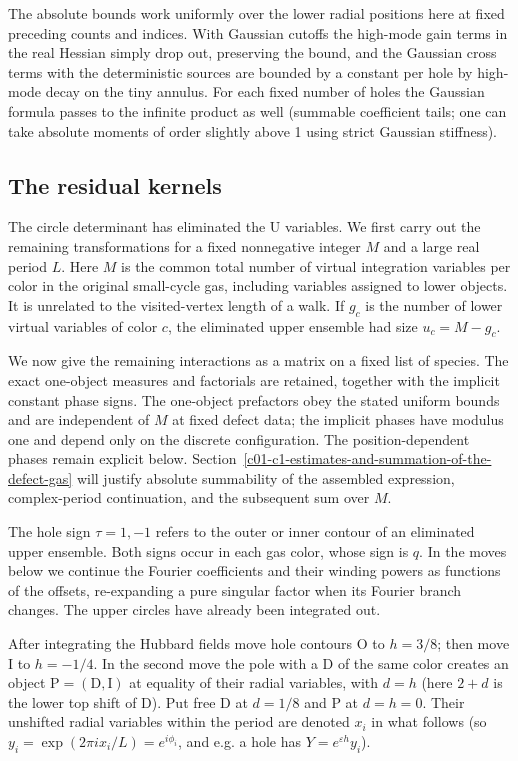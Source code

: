 The absolute bounds work uniformly over the lower radial positions here at fixed preceding counts and indices. With Gaussian cutoffs the high-mode gain terms in the real Hessian simply drop out, preserving the bound, and the Gaussian cross terms with the deterministic sources are bounded by a constant per hole by high-mode decay on the tiny annulus. For each fixed number of holes the Gaussian formula passes to the infinite product as well (summable coefficient tails; one can take absolute moments of order slightly above 1 using strict Gaussian stiffness).

\subsection{The residual kernels}\label{c01-c1-the-residual-kernels}

The circle determinant has eliminated the \(\mathrm U\) variables. We first carry out the remaining transformations for a fixed nonnegative integer \(M\) and a large real period \(L\). Here \(M\) is the common total number of virtual integration variables per color in the original small-cycle gas, including variables assigned to lower objects. It is unrelated to the visited-vertex length of a walk. If \(g_c\) is the number of lower virtual variables of color \(c\), the eliminated upper ensemble had size \(u_c=M-g_c\).

We now give the remaining interactions as a matrix on a fixed list of species. The exact one-object measures and factorials are retained, together with the implicit constant phase signs. The one-object prefactors obey the stated uniform bounds and are independent of \(M\) at fixed defect data; the implicit phases have modulus one and depend only on the discrete configuration. The position-dependent phases remain explicit below. Section~\ref{c01-c1-estimates-and-summation-of-the-defect-gas} will justify absolute summability of the assembled expression, complex-period continuation, and the subsequent sum over \(M\).

The hole sign \(\tau=1,-1\) refers to the outer or inner contour of an eliminated upper ensemble. Both signs occur in each gas color, whose sign is \(q\). In the moves below we continue the Fourier coefficients and their winding powers as functions of the offsets, re-expanding a pure singular factor when its Fourier branch changes. The upper circles have already been integrated out.

After integrating the Hubbard fields move hole contours O to \(h=3/8\); then move I to \(h=-1/4\). In the second move the pole with a D of the same color creates an object \(\mathrm P=(\mathrm D,\mathrm I)\) at equality of their radial variables, with \(d=h\) (here \(2+d\) is the lower top shift of D). Put free D at \(d=1/8\) and P at \(d=h=0\). Their unshifted radial variables within the period are denoted \(x_i\) in what follows (so \(y_i=\exp(2\pi i x_i/L)=e^{i\phi_i}\), and e.g. a hole has \(Y=e^{\varepsilon h}y_i\)).

